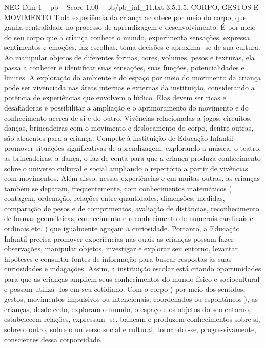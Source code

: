 \begin{textsample}{NEG Dim 1 – pb – Score 1.00 – pb/pb\_inf\_11.txt}  \label{ex:f1_neg_143}
3.5.1.5.
CORPO, GESTOS E MOVIMENTO Toda experiência da criança acontece por meio do corpo, que ganha centralidade no processo de aprendizagem e desenvolvimento.
É por meio do seu corpo que a criança conhece o mundo, experimenta sensações, expressa sentimentos e emoções, faz escolhas, toma decisões e aproxima -se de sua cultura.
Ao manipular objetos de diferentes formas, cores, volumes, pesos e texturas, ela passa a conhecer e identificar suas sensações, suas funções, potencialidades e limites.
A exploração do ambiente e do espaço por meio do movimento da criança pode ser vivenciada nas áreas internas e externas da instituição, considerando a potência de experiências que envolvem o lúdico.
Elas devem ser ricas e desafiadoras e possibilitar a ampliação e o aprimoramento do movimento e do conhecimento acerca de si e do outro.
Vivências relacionadas a jogos, circuitos, danças, brincadeiras com o movimento e deslocamento do corpo, dentre outras, são atraentes para a criança.
Compete à instituição de Educação Infantil promover situações significativas de aprendizagem, explorando a música, o teatro, as brincadeiras, a dança, o faz de conta para que a criança produza conhecimento sobre o universo cultural e social ampliando o repertório a partir de vivências com movimentos.
Além disso, nessas experiências e em muitas outras, as crianças também se deparam, frequentemente, com conhecimentos matemáticos ( contagem, ordenação, relações entre quantidades, dimensões, medidas, comparação de pesos e de comprimentos, avaliação de distâncias, reconhecimento de formas geométricas, conhecimento e reconhecimento de numerais cardinais e ordinais etc. ) que igualmente aguçam a curiosidade.
Portanto, a Educação Infantil precisa promover experiências nas quais as crianças possam fazer observações, manipular objetos, investigar e explorar seu entorno, levantar hipóteses e consultar fontes de informação para buscar respostas às suas curiosidades e indagações.
Assim, a instituição escolar está criando oportunidades para que as crianças ampliem seus conhecimentos do mundo físico e sociocultural e possam utilizá -los em seu cotidiano.
Com o corpo ( por meio dos sentidos, gestos, movimentos impulsivos ou intencionais, coordenados ou espontâneos ), as crianças, desde cedo, exploram o mundo, o espaço e os objetos do seu entorno, estabelecem relações, expressam -se, brincam e produzem conhecimentos sobre si, sobre o outro, sobre o universo social e cultural, tornando -se, progressivamente, conscientes dessa corporeidade.

\end{textsample}

